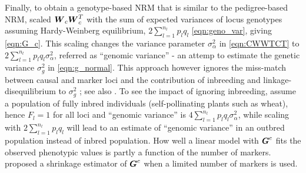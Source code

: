 Finally, to obtain a genotype-based NRM that is similar to the pedigree-based NRM,
\cite{vanraden2008efficient} scaled $\boldsymbol{W}_c\boldsymbol{W}_c^T$ with
the sum of expected variances of locus genotypes assuming Hardy-Weinberg
equilibrium, $2\sum_{l=1}^{n_l} p_l q_l$ \eqref{eqn:geno_var}, giving
\eqref{eqn:G_c}.
%
This scaling changes the variance parameter $\sigma_{\alpha}^2$
in \eqref{eqn:CWWTCT} to $2\sum_{l=1}^{n_l} p_l q_l\sigma_{\alpha}^2$,
referred as ``genomic variance'' - an attemp to estimate the genetic variance
$\sigma_g^2$ in \eqref{eqn:g_normal}.
%
This approach however ignores the miss-match between causal and
marker loci \citep{deloscampos2015genomic} and the contribution of
inbreeding and linkage-disequilibrium to $\sigma_g^2$ \citep{lara2022temporal};
see also \cite{shi2016contrasting, hou2019accurate, rawlik2020snp}.
%
To see the impact of ignoring inbreeding, assume a population of
fully inbred individuals (self-pollinating plants such as wheat),
hence $F_l = 1$ for all loci and ``genomic variance'' is
$4\sum_{l=1}^{n_l} p_l q_l\sigma_{\alpha}^2$, while scaling with
$2\sum_{l=1}^{n_l} p_l q_l$ will lead to an estimate of ``genomic
variance'' in an outbred population instead of inbred population.
%
How well a linear model with $\boldsymbol{G}^{c}$ fits the observed
phenotypic values is partly a function of the number of markers.
%
\cite{endelman2012shrinkage} proposed a shrinkage estimator of
$\boldsymbol{G}^{c}$ when a limited number of markers is used.

